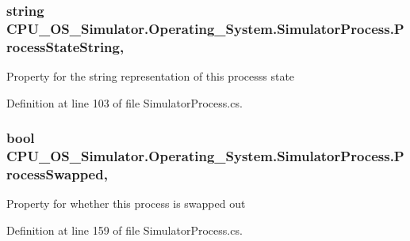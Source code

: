 \subsubsection[{Process\+State\+String}]{\setlength{\rightskip}{0pt plus 5cm}string C\+P\+U\+\_\+\+O\+S\+\_\+\+Simulator.\+Operating\+\_\+\+System.\+Simulator\+Process.\+Process\+State\+String\hspace{0.3cm}{\ttfamily [get]}, {\ttfamily [set]}}\label{class_c_p_u___o_s___simulator_1_1_operating___system_1_1_simulator_process_a3bd1a31943fcbd2ebb2402bd0fff705f}


Property for the string representation of this process\textquotesingle{}s state 



Definition at line 103 of file Simulator\+Process.\+cs.

\hypertarget{class_c_p_u___o_s___simulator_1_1_operating___system_1_1_simulator_process_a7886e0890797887fcdd65b6eac62cfc0}{}
\subsubsection[{Process\+Swapped}]{\setlength{\rightskip}{0pt plus 5cm}bool C\+P\+U\+\_\+\+O\+S\+\_\+\+Simulator.\+Operating\+\_\+\+System.\+Simulator\+Process.\+Process\+Swapped\hspace{0.3cm}{\ttfamily [get]}, {\ttfamily [set]}}\label{class_c_p_u___o_s___simulator_1_1_operating___system_1_1_simulator_process_a7886e0890797887fcdd65b6eac62cfc0}


Property for whether this process is swapped out 



Definition at line 159 of file Simulator\+Process.\+cs.

\hypertarget{class_c_p_u___o_s___simulator_1_1_operating___system_1_1_simulator_process_a594fe15fec1c942ccfbcfa9c345624ee}{}
